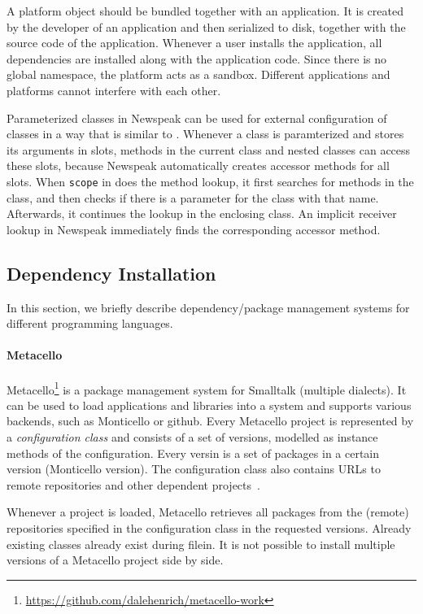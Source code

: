 A platform object should be bundled together with an application. It is created by the developer of an application and then serialized to disk, together with the source code of the application. Whenever a user installs the application, all dependencies are installed along with the application code. Since there is no global namespace, the platform acts as a sandbox. Different applications and platforms cannot interfere with each other.

Parameterized classes in Newspeak can be used for external configuration of classes in a way that is similar to \msname. Whenever a class is paramterized and stores its arguments in slots, methods in the current class and nested classes can access these slots, because Newspeak automatically creates accessor methods for all slots. When \texttt{scope} in \msname does the method lookup, it first searches for methods in the class, and then checks if there is a parameter for the class with that name. Afterwards, it continues the lookup in the enclosing class. An implicit receiver lookup in Newspeak immediately finds the corresponding accessor method.

\subsection{Dependency Installation}
\label{sec:rel_metacello}
In this section, we briefly describe dependency/package management systems for different programming languages.

\paragraph{Metacello}
Metacello\footnote{\url{https://github.com/dalehenrich/metacello-work}} is a package management system for Smalltalk (multiple dialects). It can be used to load applications and libraries into a system and supports various backends, such as Monticello or github. Every Metacello project is represented by a \emph{configuration class} and consists of a set of versions, modelled as instance methods of the configuration. Every versin is a set of packages in a certain version (Monticello version). The configuration class also contains URLs to remote repositories and other dependent projects~\cite{metacellodraft}.

Whenever a project is loaded, Metacello retrieves all packages from the (remote) repositories specified in the configuration class in the requested versions. Already existing classes already exist during filein. It is not possible to install multiple versions of a Metacello project side by side.

